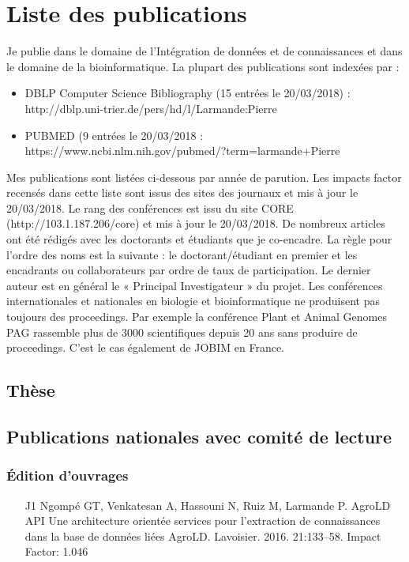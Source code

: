 \chapter{Liste des publications}
Je publie dans le domaine de l’Intégration de données et de connaissances et dans le domaine de la bioinformatique. La plupart des publications sont indexées par :

\begin{itemize}
\item DBLP Computer Science Bibliography (15 entrées le 20/03/2018) : \\
http://dblp.uni-trier.de/pers/hd/l/Larmande:Pierre
\item PUBMED (9 entrées le  20/03/2018 : \\
https://www.ncbi.nlm.nih.gov/pubmed/?term=larmande+Pierre 
\end{itemize}

\vspace{0.5cm}
Mes publications sont listées ci-dessous par année de parution. Les impacts factor recensés dans cette liste sont issus des sites des journaux et mis à jour le 20/03/2018. Le rang des conférences est issu du site CORE (http://103.1.187.206/core) et mis à jour le 20/03/2018.
De nombreux articles ont été rédigés avec les doctorants et étudiants que je co-encadre. La règle pour l’ordre des noms est la suivante : le doctorant/étudiant en premier et les encadrants ou collaborateurs par ordre de taux de participation. Le dernier auteur est en général le « Principal Investigateur » du projet.
Les conférences internationales et nationales en biologie et bioinformatique ne produisent pas toujours des proceedings. Par exemple la conférence Plant et Animal Genomes PAG rassemble plus de 3000 scientifiques depuis 20 ans sans produire de proceedings. C’est le cas également de JOBIM en France. 

\section*{Thèse}

\section*{Publications nationales avec comité de lecture}
\subsection*{Édition d’ouvrages} 
\begin{itemize}
\item [J1]	Ngompé GT, Venkatesan A, Hassouni N, Ruiz M, Larmande P. AgroLD API Une architecture orientée services pour l’extraction de connaissances dans la base de données liées AgroLD. Lavoisier. 2016. 21:133–58. Impact Factor: 1.046
\end{itemize}

